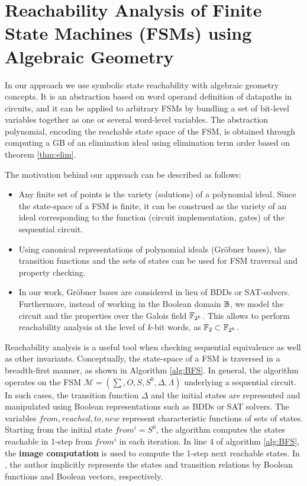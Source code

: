 \section{Reachability Analysis of Finite State Machines (FSMs) using Algebraic Geometry}
In our approach we use symbolic state reachability with algebraic
geometry concepts. It is an abstraction based on word operand
definition of datapaths in circuits, and it can be applied
to arbitrary FSMs by bundling a set of bit-level variables together as
one or several word-level variables.  The abstraction polynomial,
encoding the reachable state space of the FSM, is obtained through
computing a GB of an elimination ideal using elimination term order
based on theorem \ref{thm:elim}.  

The motivation behind our approach can be described as follows:
\begin{itemize}
\item Any finite set of points is the variety (solutions) of a
  polynomial ideal. Since the state-space of a FSM is finite, it can
  be construed as the variety of an ideal corresponding to the
  function (circuit implementation, gates) of the   sequential circuit.
\item Using canonical representations of polynomial ideals (Gr\"obner
  bases), the transition functions and the sets of states can be used
  for FSM traversal and property checking. 
\item In our work, Gr\"obner bases are considered in lieu of BDDs or
  SAT-solvers. Furthermore, instead of working in the Boolean domain
  ${\mathbb{B}}$, we model the circuit and the properties over the Galois field
  ${\mathbb{F}}_{2^k}$. This allows to perform reachability analysis at the level of
  $k$-bit words, as $\mathbb{F}_2 \subset {\mathbb{F}}_{2^k}$.

\end{itemize}

Reachability analysis is a useful tool when checking sequential
equivalence as well as other invariants. 
Conceptually, the state-space of a FSM is traversed in a breadth-first
manner, as shown in Algorithm \ref{alg:BFS}. %
In general, the algorithm operates on the FSM 
$\mathcal{M} = (\sum, O, S, S^0, \Delta, \Lambda)$ underlying a
sequential circuit. In such cases, the transition function $\Delta$
and the initial states are represented and manipulated using Boolean
representations such as BDDs or SAT solvers. The variables $from,
reached, to, new$ represent characteristic functions of sets of
states. Starting from the initial state $from^i = S^0$, the algorithm
computes the states reachable in 1-step from $from^i$ in each iteration.
In line 4 of algorithm \ref{alg:BFS}, the {\bf image computation} is
used to compute the 1-step next reachable states. In
\cite{KallaPartialScan}, the author implicitly represents the states
and transition relations by Boolean functions and Boolean vectors,
respectively. 


